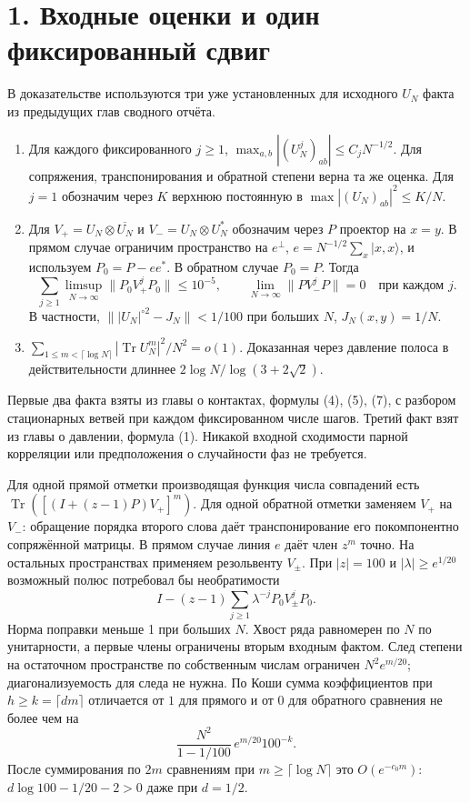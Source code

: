 \documentclass[11pt,a4paper]{article}
\newcommand{\Tr}{\operatorname{Tr}}
\newcommand{\sect}[1]{\section*{\sffamily\color{ink}#1}}
\begin{document}
\newpage
\sect{1. Входные оценки и один фиксированный сдвиг}
В доказательстве используются три уже установленных для исходного \(U_N\) факта из предыдущих глав сводного отчёта.

\begin{enumerate}
\item Для каждого фиксированного \(j\ge1\),
\(\max_{a,b}|(U_N^j)_{ab}|\le C_j N^{-1/2}\).
Для сопряжения, транспонирования и обратной степени верна та же оценка. Для \(j=1\) обозначим через \(K\) верхнюю постоянную в \(\max |(U_N)_{ab}|^2\le K/N\).
\item Для \(V_+=U_N\otimes\overline{U_N}\) и \(V_-=U_N\otimes U_N^*\) обозначим через \(P\) проектор на \(x=y\). В прямом случае ограничим пространство на \(e^\perp\), \(e=N^{-1/2}\sum_x|x,x\rangle\), и используем \(P_0=P-ee^*\). В обратном случае \(P_0=P\). Тогда
\[
 \sum_{j\ge1}\limsup_{N\to\infty}
    \|P_0 V_+^jP_0\|\le10^{-5},\qquad
 \lim_{N\to\infty}\|P V_-^jP\|=0\quad\text{при каждом }j.
\]
В частности, \(\||U_N|^{\circ2}-J_N\|<1/100\) при больших \(N\), \(J_N(x,y)=1/N\).
\item \(\sum_{1\le m<\lceil\log N\rceil}|\Tr U_N^m|^2/N^2=o(1)\).
Доказанная через давление полоса в действительности длиннее \(2\log N/\log(3+2\sqrt2)\).
\end{enumerate}

Первые два факта взяты из главы о контактах, формулы (4), (5), (7), с разбором стационарных ветвей при каждом фиксированном числе шагов. Третий факт взят из главы о давлении, формула (1). Никакой входной сходимости парной корреляции или предположения о случайности фаз не требуется.

Для одной прямой отметки производящая функция числа совпадений есть
\(\Tr([(I+(z-1)P)V_+]^m)\).
Для одной обратной отметки заменяем \(V_+\) на \(V_-\): обращение порядка второго слова даёт транспонирование его покомпонентно сопряжённой матрицы.
В прямом случае линия \(e\) даёт член \(z^m\) точно. На остальных пространствах применяем резольвенту \(V_\pm\).
При \(|z|=100\) и \(|\lambda|\ge e^{1/20}\) возможный полюс потребовал бы необратимости
\[
        I-(z-1)\sum_{j\ge1}\lambda^{-j}P_0V_\pm^j P_0 .
\]
Норма поправки меньше 1 при больших \(N\). Хвост ряда равномерен по \(N\) по унитарности, а первые члены ограничены вторым входным фактом. След степени на остаточном пространстве по собственным числам ограничен \(N^2 e^{m/20}\); диагонализуемость для следа не нужна.
По Коши сумма коэффициентов при \(h\ge k=\lceil dm\rceil\) отличается от \(1\) для прямого и от \(0\) для обратного сравнения не более чем на
\[
              \frac{N^2}{1-1/100}\,e^{m/20}100^{-k}.
\]
После суммирования по \(2m\) сравнениям при \(m\ge\lceil\log N\rceil\) это \(O(e^{-c_0 m})\):
\(d\log100-1/20-2>0\) даже при \(d=1/2\).
\end{document}
